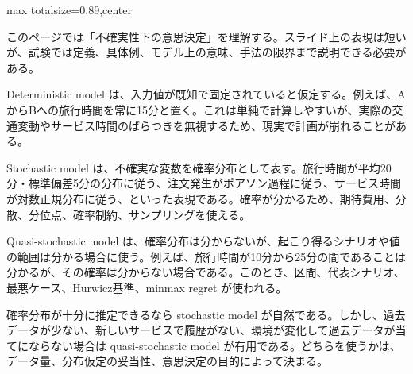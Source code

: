 \begin{minipage}[t]{0.58\textwidth}
\begin{adjustbox}{max totalsize={\textwidth}{0.89\textheight},center}
\begin{minipage}{\textwidth}\scriptsize
{}このページでは「不確実性下の意思決定」を理解する。スライド上の表現は短いが、試験では定義、具体例、モデル上の意味、手法の限界まで説明できる必要がある。\par
Deterministic model は、入力値が既知で固定されていると仮定する。例えば、AからBへの旅行時間を常に15分と置く。これは単純で計算しやすいが、実際の交通変動やサービス時間のばらつきを無視するため、現実で計画が崩れることがある。\par
Stochastic model は、不確実な変数を確率分布として表す。旅行時間が平均20分・標準偏差5分の分布に従う、注文発生がポアソン過程に従う、サービス時間が対数正規分布に従う、といった表現である。確率が分かるため、期待費用、分散、分位点、確率制約、サンプリングを使える。\par
Quasi-stochastic model は、確率分布は分からないが、起こり得るシナリオや値の範囲は分かる場合に使う。例えば、旅行時間が10分から25分の間であることは分かるが、その確率は分からない場合である。このとき、区間、代表シナリオ、最悪ケース、Hurwicz基準、minmax regret が使われる。\par
確率分布が十分に推定できるなら stochastic model が自然である。しかし、過去データが少ない、新しいサービスで履歴がない、環境が変化して過去データが当てにならない場合は quasi-stochastic model が有用である。どちらを使うかは、データ量、分布仮定の妥当性、意思決定の目的によって決まる。\par

\end{minipage}
\end{adjustbox}
\end{minipage}
